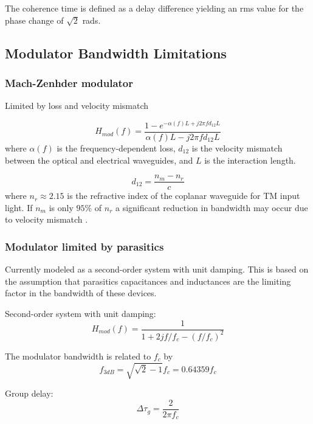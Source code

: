 \documentclass[a4paper]{article}
\begin{document}
The coherence time is defined as a delay difference yielding an rms value for the phase change of $\sqrt{2}$ rads.

\subsection{Modulator Bandwidth Limitations}

\subsubsection{Mach-Zenhder modulator}
\cite{Barros2009, Ho2005}

Limited by loss and velocity mismatch

\begin{equation}
H_{mod}(f) = \frac{1-e^{-\alpha(f)L+j2\pi fd_{12}L}}{\alpha(f)L-j2\pi fd_{12}L}
\end{equation}
where $\alpha(f)$ is the frequency-dependent loss, $d_{12}$ is the velocity mismatch between the optical and electrical waveguides, and $L$ is the interaction length.

\begin{equation}
d_{12} = \frac{n_m-n_r}{c}
\end{equation}
where $n_r \approx 2.15$ is the refractive index of the coplanar waveguide for TM input light. If $n_m$ is only $95\%$ of $n_r$ a significant reduction in bandwidth may occur due to velocity mismatch \cite{Ho2005}.

\subsubsection{Modulator limited by parasitics}
Currently modeled as a second-order system with unit damping. This is based on the assumption that parasitics capacitances and inductances are the limiting factor in the bandwidth of these devices.

Second-order system with unit damping:
\begin{equation}
H_{mod}(f) =  \frac{1}{1 + 2jf/f_c - (f/f_c)^2}
\end{equation}

The modulator bandwidth is related to $f_c$ by
\begin{equation}
f_{3dB} = \sqrt{\sqrt{2}-1}f_c = 0.64359f_c
\end{equation}

Group delay:
\begin{equation}
\Delta\tau_g = \frac{2}{2\pi f_c}
\end{equation}
\end{document}
